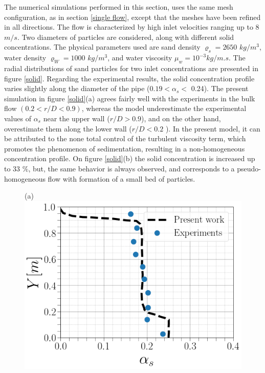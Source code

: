 \documentclass[11pt]{report}
\begin{document}
%
The numerical simulations performed in this section, uses the same mesh configuration, as in section \ref{single flow}, except that the meshes have been refined in all directions. 
%
The flow is characterized by high inlet velocities ranging up to 8 $m/s$. 
%
Two diameters of particles are considered, along with different solid concentrations. 
%
The physical parameters used are sand density $\varrho_s=2650$ $kg/m^3$, water density $\varrho_W=1000$ $kg/m^3$, and water viscosity $\mu_w= 10^{-3} kg/m.s$. 
%
The radial distributions of sand particles for two inlet concentrations are presented in figure \ref{solid}. 
%
Regarding the experimental results, the solid concentration profile varies slightly along the diameter of the pipe ($ 0.19 <\alpha_s <$ 0.24). 
%
The present simulation in figure \ref{solid}(a) agrees fairly well with the experiments in the bulk flow $(0.2<r/D <0.9)$, whereas the model underestimate the experimental values of $ \alpha_s $ near the upper wall ($ r / D> 0.9 $), and on the other hand, 
%
overestimate them along the lower wall ($ r / D <0.2 $ ). In the present model, it can be attributed to the none total control of the turbulent viscosity term, which promotes the phenomenon of sedimentation, resulting in a non-homogeneous concentration profile. 
%
On figure \ref{solid}(b) the solid concentration is increased up to $33$ $\%$, but, the same behavior is always observed, and corresponds to a pseudo-homogeneous flow with formation of a small bed of particles.  \\
%
\begin{figure}[ht!]
 \begin{center}
 (a)\includegraphics[scale = 0.3]{figs/3C}
 \end{center}
 \end{figure}
\end{document}
